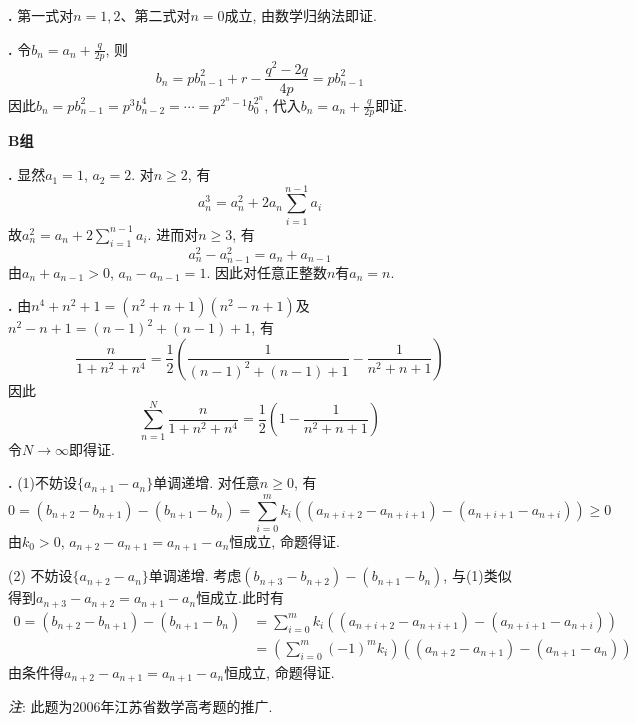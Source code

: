 \par \textbf{\thesolseq .} 第一式对$n=1,2$、第二式对$n=0$成立, 由数学归纳法即证.


\par \textbf{\thesolseq .} 令$b_n=a_n+\frac{q}{2p}$, 则
\begin{equation}
    b_n = pb_{n-1}^2+r-\frac{q^2-2q}{4p}= pb_{n-1}^2
\end{equation}
因此$b_n=pb_{n-1}^2=p^3b_{n-2}^4=\cdots=p^{2^n-1}b_0^{2^n}$, 代入$b_n=a_n+\frac{q}{2p}$即证. 

\par \textbf{B组}
\par \textbf{\thesolseq .} \cite{SMI} 显然$a_1=1$, $a_2=2$. 对$n\ge 2$, 有
\begin{equation}
    a_n^3=a_n^2+2a_n\sum_{i=1}^{n-1}a_i
\end{equation}
故$a_n^2=a_n+2\sum_{i=1}^{n-1}a_i$. 进而对$n\ge 3$, 有
\begin{equation}
    a_n^2-a_{n-1}^2=a_n+a_{n-1}
\end{equation}
由$a_n+a_{n-1}>0$, $a_n-a_{n-1}=1$. 因此对任意正整数$n$有$a_n=n$. 

\par \textbf{\thesolseq .} 由$n^4+n^2+1=(n^2+n+1)(n^2-n+1)$及$n^2-n+1=(n-1)^2+(n-1)+1$, 有
\begin{equation}
    \frac{n}{1+n^2+n^4}=\frac{1}{2}\left(\frac{1}{(n-1)^2+(n-1)+1}-\frac{1}{n^2+n+1}\right)
\end{equation}
因此
\begin{equation}
    \sum_{n=1}^N \frac{n}{1+n^2+n^4}=\frac{1}{2}\left(1-\frac{1}{n^2+n+1}\right)
\end{equation}
令$N\to\infty$即得证. 

\par \textbf{\thesolseq .} (1)不妨设$\{a_{n+1}-a_{n}\}$单调递增. 对任意$n\ge 0$, 有
\begin{equation*}
    0 = (b_{n+2}-b_{n+1})-(b_{n+1}-b_{n})=\sum_{i=0}^m k_i((a_{n+i+2}-a_{n+i+1})-(a_{n+i+1}-a_{n+i}))\ge 0
\end{equation*}
由$k_0>0$, $a_{n+2}-a_{n+1}=a_{n+1}-a_{n}$恒成立, 命题得证. 
\par (2) 不妨设$\{a_{n+2}-a_{n}\}$单调递增. 考虑$(b_{n+3}-b_{n+2})-(b_{n+1}-b_{n})$, 与(1)类似得到$a_{n+3}-a_{n+2}=a_{n+1}-a_{n}$恒成立.此时有
\begin{align*}
    0 = (b_{n+2}-b_{n+1})-(b_{n+1}-b_{n})&=\sum_{i=0}^m k_i((a_{n+i+2}-a_{n+i+1})-(a_{n+i+1}-a_{n+i}))\\
    &=\left(\sum_{i=0}^m (-1)^m k_i\right)((a_{n+2}-a_{n+1})-(a_{n+1}-a_n))
\end{align*}  
由条件得$a_{n+2}-a_{n+1}=a_{n+1}-a_{n}$恒成立, 命题得证. 
\par \emph{注}: 此题为2006年江苏省数学高考题的推广. 

